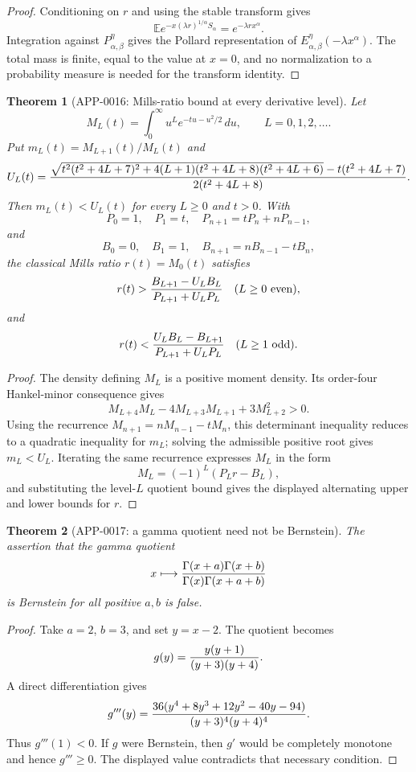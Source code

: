 \documentclass[11pt]{article}
\numberwithin{equation}{section}
\newtheorem{theorem}{Theorem}[section]
\theoremstyle{definition}
\theoremstyle{remark}
\newcommand{\1}{\mathbf 1}
\begin{document}
\begin{proof}
Conditioning on \(r\) and using the stable transform gives
\[
 \mathbb E e^{-x(\lambda r)^{1/\alpha}S_\alpha}=e^{-\lambda r x^\alpha}.
\]
Integration against \(P_{\alpha,\beta}^{\eta}\) gives the Pollard
representation of \(E_{\alpha,\beta}^{\eta}(-\lambda x^\alpha)\).  The total
mass is finite, equal to the value at \(x=0\), and no normalization to a
probability measure is needed for the transform identity.
\end{proof}

\begin{theorem}[APP-0016: Mills-ratio bound at every derivative level]
\label{thm:app16-mills-all-l}
Let
\[
  M_L(t)=\int_0^\infty u^L e^{-tu-u^2/2}\,du,\qquad L=0,1,2,\ldots .
\]
Put \(m_L(t)=M_{L+1}(t)/M_L(t)\) and
\[
 U_L(t)=
 {\sqrt{t^2(t^2+4L+7)^2+4(L+1)(t^2+4L+8)(t^2+4L+6)}
       -t(t^2+4L+7)
  \over 2(t^2+4L+8)} .
\]
Then \(m_L(t)<U_L(t)\) for every \(L\ge0\) and \(t>0\).  With
\[
P_0=1,\quad P_1=t,\quad P_{n+1}=tP_n+nP_{n-1},
\]
and
\[
B_0=0,\quad B_1=1,\quad B_{n+1}=nB_{n-1}-tB_n,
\]
the classical Mills ratio \(r(t)=M_0(t)\) satisfies
\[
 r(t)>{B_{L+1}-U_LB_L\over P_{L+1}+U_LP_L}\quad(L\ge0\ {\rm even}),
\]
and
\[
 r(t)<{U_LB_L-B_{L+1}\over P_{L+1}+U_LP_L}\quad(L\ge1\ {\rm odd}).
\]
\end{theorem}

\begin{proof}
The density defining \(M_L\) is a positive moment density.  Its order-four
Hankel-minor consequence gives
\[
M_{L+4}M_L-4M_{L+3}M_{L+1}+3M_{L+2}^2>0.
\]
Using the recurrence \(M_{n+1}=nM_{n-1}-tM_n\), this determinant inequality
reduces to a quadratic inequality for \(m_L\); solving the admissible positive
root gives \(m_L<U_L\).  Iterating the same recurrence expresses \(M_L\) in the
form
\[
M_L=(-1)^L(P_L r-B_L),
\]
and substituting the level-\(L\) quotient bound gives the displayed alternating
upper and lower bounds for \(r\).
\end{proof}

\begin{theorem}[APP-0017: a gamma quotient need not be Bernstein]
\label{thm:app17-baricz-counterexample}
The assertion that the gamma quotient
\[
 x\longmapsto {\Gamma(x+a)\Gamma(x+b)\over \Gamma(x)\Gamma(x+a+b)}
\]
is Bernstein for all positive \(a,b\) is false.
\end{theorem}

\begin{proof}
Take \(a=2\), \(b=3\), and set \(y=x-2\).  The quotient becomes
\[
  g(y)={y(y+1)\over (y+3)(y+4)} .
\]
A direct differentiation gives
\[
  g'''(y)=
 {36(y^4+8y^3+12y^2-40y-94)\over (y+3)^4(y+4)^4}.
\]
Thus \(g'''(1)<0\).  If \(g\) were Bernstein, then \(g'\) would be completely
monotone and hence \(g'''\ge0\).  The displayed value contradicts that
necessary condition.
\end{proof}
\end{document}
